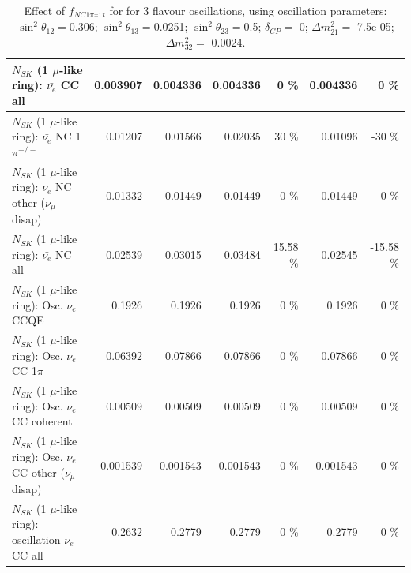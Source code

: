 \begin{table}
\begin{tabular}{| l | r | r | r  r | r  r |}
                            $N_{SK}$ (1 $\mu$-like ring): $\bar{\nu_{e}}$ CC all &        0.003907 &        0.004336 &        0.004336 &        0 \%  &        0.004336 &        0 \%  \\ 
\hline
                     $N_{SK}$ (1 $\mu$-like ring): $\bar{\nu_e}$ NC 1$\pi^{+/-}$ &         0.01207 &         0.01566 &         0.02035 &       30 \%  &         0.01096 &      -30 \%  \\ 
          $N_{SK}$ (1 $\mu$-like ring): $\bar{\nu_e}$ NC other ($\nu_\mu$ disap) &         0.01332 &         0.01449 &         0.01449 &        0 \%  &         0.01449 &        0 \%  \\ 
                            $N_{SK}$ (1 $\mu$-like ring): $\bar{\nu_{e}}$ NC all &         0.02539 &         0.03015 &         0.03484 &    15.58 \%  &         0.02545 &   -15.58 \%  \\ 
\hline
\hline
\hline
                                 $N_{SK}$ (1 $\mu$-like ring): Osc. $\nu_e$ CCQE &          0.1926 &          0.1926 &          0.1926 &        0 \%  &          0.1926 &        0 \%  \\ 
                            $N_{SK}$ (1 $\mu$-like ring): Osc. $\nu_e$ CC 1$\pi$ &         0.06392 &         0.07866 &         0.07866 &        0 \%  &         0.07866 &        0 \%  \\ 
                          $N_{SK}$ (1 $\mu$-like ring): Osc. $\nu_e$ CC coherent &         0.00509 &         0.00509 &         0.00509 &        0 \%  &         0.00509 &        0 \%  \\ 
           $N_{SK}$ (1 $\mu$-like ring): Osc. $\nu_e$ CC other ($\nu_\mu$ disap) &        0.001539 &        0.001543 &        0.001543 &        0 \%  &        0.001543 &        0 \%  \\ 
                        $N_{SK}$ (1 $\mu$-like ring): oscillation $\nu_e$ CC all &          0.2632 &          0.2779 &          0.2779 &        0 \%  &          0.2779 &        0 \%  \\ 
\hline
\hline
\end{tabular}
\caption{ Effect of $f_{NC1\pi^\pm; t}$ for for 3 flavour oscillations, using oscillation parameters:  $\sin^2\theta_{12} = $0.306; $\sin^2\theta_{13} = $0.0251; $\sin^2\theta_{23} = $0.5; $\delta_{CP} = $        0; $\Delta m^2_{21} = $    7.5e-05; $\Delta m^2_{32} = $    0.0024. }
\label{tab:num_xsec_norm_nc1piC_1RmuT_3f_osc_t13:0.0251}
\end{table}
\clearpage
